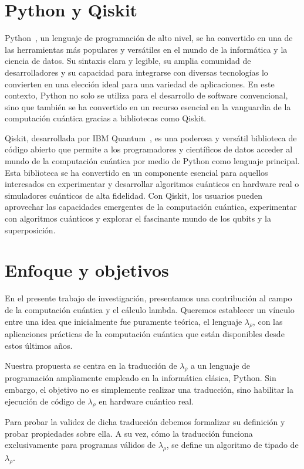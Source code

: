 \section*{Python y Qiskit}
Python~\cite{PythonReference}, un lenguaje de programación de alto nivel, se ha convertido en una de las herramientas más populares y versátiles en el mundo de la informática y la ciencia de datos. Su sintaxis clara y legible, su amplia comunidad de desarrolladores y su capacidad para integrarse con diversas tecnologías lo convierten en una elección ideal para una variedad de aplicaciones. En este contexto, Python no solo se utiliza para el desarrollo de software convencional, sino que también se ha convertido en un recurso esencial en la vanguardia de la computación cuántica gracias a bibliotecas como Qiskit.

Qiskit, desarrollada por IBM Quantum~\cite{ibmquantum}, es una poderosa y versátil biblioteca de código abierto que permite a los programadores y científicos de datos acceder al mundo de la computación cuántica por medio de Python como lenguaje principal. Esta biblioteca se ha convertido en un componente esencial para aquellos interesados en experimentar y desarrollar algoritmos cuánticos en hardware real o simuladores cuánticos de alta fidelidad. Con Qiskit, los usuarios pueden aprovechar las capacidades emergentes de la computación cuántica, experimentar con algoritmos cuánticos y explorar el fascinante mundo de los qubits y la superposición.

\section*{Enfoque y objetivos}

En el presente trabajo de investigación, presentamos una contribución al campo de la computación cuántica y el cálculo lambda. Queremos establecer un vínculo entre una idea que inicialmente fue puramente teórica, el lenguaje $\lambda_\rho$, con las aplicaciones prácticas de la computación cuántica que están disponibles desde estos últimos años.

Nuestra propuesta se centra en la traducción de $\lambda_\rho$ a un lenguaje de programación ampliamente empleado en la informática clásica, Python. Sin embargo, el objetivo no es simplemente realizar una traducción, sino habilitar la ejecución de código de $\lambda_\rho$ en hardware cuántico real.

Para probar la validez de dicha traducción debemos formalizar su definición y probar propiedades sobre ella. A su vez, cómo la traducción funciona exclusivamente para programas válidos de $\lambda_\rho$, se define un algoritmo de tipado de $\lambda_\rho$.

